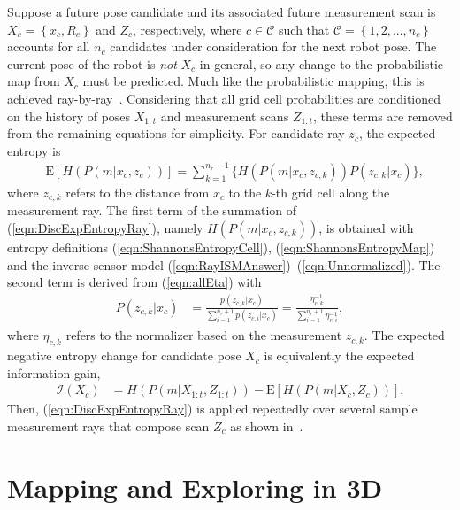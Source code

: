 \documentclass[smallextended]{svjour3}       %
\newcommand{\braces}[1]{\ensuremath{\left\{ #1 \right\}}}
\newcommand{\refeqn}[1]{(\ref{eqn:#1})}
\newcommand{\argmax}{\operatornamewithlimits{argmax}}
\begin{document}
Suppose a future pose candidate and its associated future measurement scan is $X_c=\braces{x_c,R_c}$ and $Z_c$, respectively, where $c\in\mathcal C$ such that $\mathcal C=\braces{1,2,...,n_c}$ accounts for all $n_c$ candidates under consideration for the next robot pose. The current pose of the robot is \emph{not} $X_c$ in general, so any change to the probabilistic map from $X_c$ must be predicted. Much like the probabilistic mapping, this is achieved ray-by-ray~\cite{KauAiLee16,KauTakAiLee17}. Considering that all grid cell probabilities are conditioned on the history of poses $X_{1:t}$ and measurement scans $Z_{1:t}$, these terms are removed from the remaining equations for simplicity. For candidate ray $z_c$, the expected entropy is
\begin{align}
\label{eqn:DiscExpEntropyRay}
&\text{E}[H(P(m|x_c,z_{c}))]=\sum_{k=1}^{n_{r}+1}\bigg\{H(P(m|x_c,z_{c,k}))P(z_{c,k}|x_c)\bigg\},
\end{align}
where $z_{c,k}$ refers to the distance from $x_c$ to the $k$-th grid cell along the measurement ray. The first term of the summation of \refeqn{DiscExpEntropyRay}, namely $H(P(m|x_c,z_{c,k}))$, is obtained with entropy definitions \refeqn{ShannonsEntropyCell}, \refeqn{ShannonsEntropyMap} and the inverse sensor model \refeqn{RayISMAnswer}--\refeqn{Unnormalized}. The second term is derived from \refeqn{allEta} with
\begin{align}
\label{eqn:ProbMeas}
P(z_{c,k}|x_c)&=\frac{p(z_{c,k}|x_c)}{\sum_{i=1}^{n_{r}+1}p(z_{c,i}|x_c)}=\frac{\eta_{c,k}^{-1}}{\sum_{i=1}^{n_{r}+1}\eta_{c,i}^{-1}},
\end{align}
where $\eta_{c,k}$ refers to the normalizer based on the measurement $z_{c,k}$.
The expected negative entropy change for candidate pose $X_c$ is equivalently the expected information gain,
\begin{align}
\label{eqn:expectedInfoGainRay}
\mathcal I(X_c)&=H(P(m|X_{1:t},Z_{1:t}))-\text{E}\left[H(P(m|X_c,Z_c))\right].
\end{align}
Then, \refeqn{DiscExpEntropyRay} is applied repeatedly over several sample measurement rays that compose scan $Z_c$ as shown in~\cite{KauAiLee16}.



\section{Mapping and Exploring in 3D}
\end{document}
